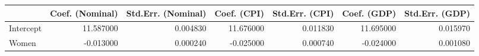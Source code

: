 \begin{tabular}{lrrrrrr}
\toprule
 & Coef. (Nominal) & Std.Err. (Nominal) & Coef. (CPI) & Std.Err. (CPI) & Coef. (GDP) & Std.Err. (GDP) \\
\midrule
Intercept & 11.587000 & 0.004830 & 11.676000 & 0.011830 & 11.695000 & 0.015970 \\
Women & -0.013000 & 0.000240 & -0.025000 & 0.000740 & -0.024000 & 0.001080 \\
\bottomrule
\end{tabular}
